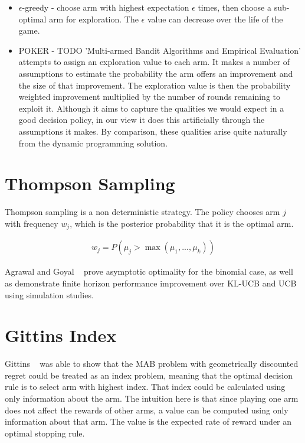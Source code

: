 \documentclass[11pt,a4,singlespacing,titlepagenumber=on]{scrreprt}
\numberwithin{equation}{chapter} %
\theoremstyle{remark}
\begin{document}
\begin{itemize}
	\item $\epsilon$-greedy - choose arm with highest expectation $\epsilon$ times, then choose a sub-optimal arm for exploration. The $\epsilon$ value can decrease over the life of the game.
	\item POKER - TODO 'Multi-armed Bandit Algorithms and Empirical Evaluation' attempts to assign an exploration value to each arm. It makes a number of assumptions to estimate the probability the arm offers an improvement and the size of that improvement. The exploration value is then the probability weighted improvement multiplied by the number of rounds remaining to exploit it. Although it aims to capture the qualities we would expect in a good decision policy, in our view it does this artificially through the assumptions it makes. By comparison, these qualities arise quite naturally from the dynamic programming solution.
\end{itemize}

\section{ Thompson Sampling }

Thompson sampling is a non deterministic strategy. The policy chooses arm $j$ with frequency $w_j$, which is the posterior probability that it is the optimal arm.

\begin{align}
w_j = P(\mu_j > \max(\mu_1, ..., \mu_k))
\end{align}

Agrawal and Goyal ~\cite{DBLP:journals/corr/abs-1111-1797} prove asymptotic optimality for the binomial case, as well as demonstrate finite horizon performance improvement over KL-UCB and UCB using simulation studies.

\section{ Gittins Index }

Gittins ~\cite{gittins1979bandit} was able to show that the MAB problem with geometrically discounted regret could be treated as an index problem, meaning that the optimal decision rule is to select arm with highest index. That index could be calculated using only information about the arm. The intuition here is that since playing one arm does not affect the rewards of other arms, a value can be computed using only information about that arm. The value is the expected rate of reward under an optimal stopping rule.
\end{document}
